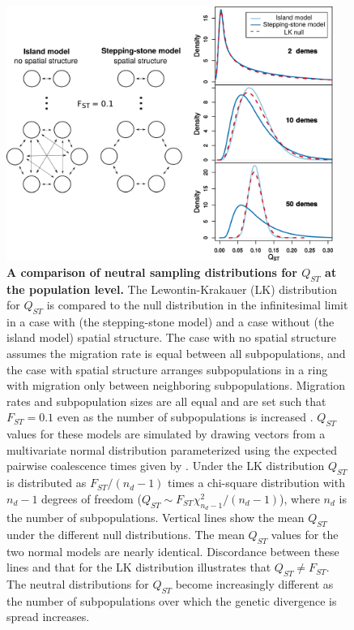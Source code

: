 \begin{figure}
  \centering
  \includegraphics[width=0.95\textwidth]{./figures/pop_struct_combine_alt.pdf}
  \caption{ \textbf{A comparison of neutral sampling distributions for $Q_{ST}$
      at the population level.} The Lewontin-Krakauer (LK) distribution for
    $Q_{ST}$ is compared to the null distribution in the infinitesimal limit in
    a case with (the stepping-stone model) and a case without (the island model)
    spatial structure. The case with no spatial structure assumes the migration
    rate is equal between all subpopulations, and the case with spatial
    structure arranges subpopulations in a ring with migration only between
    neighboring subpopulations. Migration rates and subpopulation sizes are all
    equal and are set such that $F_{ST}=0.1$ even as the number of
    subpopulations is increased \citep{Slatkin1991}. $Q_{ST}$ values for these
    models are simulated by drawing vectors from a multivariate normal
    distribution parameterized using the expected pairwise coalescence times
    given by \citep{Slatkin1991}. Under the LK distribution $Q_{ST}$ is
    distributed as $F_{ST}/(n_d - 1)$ times a chi-square distribution with $n_d
    - 1$ degrees of freedom ($Q_{ST}\sim F_{ST}\chi^2_{n_d - 1}/(n_d-1)$), where
    $n_d$ is the number of subpopulations. Vertical lines show the mean $Q_{ST}$
    under the different null distributions. The mean $Q_{ST}$ values for the two
    normal models are nearly identical. Discordance between these lines and that
    for the LK distribution illustrates that $Q_{ST} \neq F_{ST}$. The neutral
    distributions for $Q_{ST}$ become increasingly different as the number of
    subpopulations over which the genetic divergence is spread increases.}
  \label{fig:qst_deme}
\end{figure}

